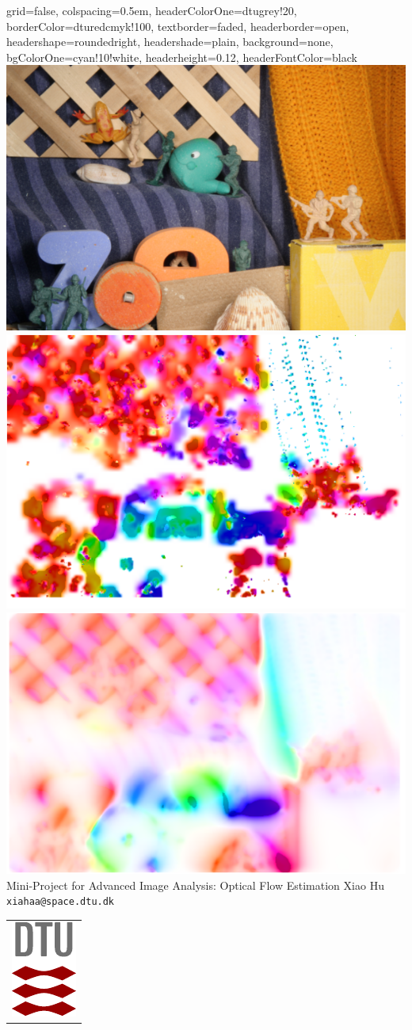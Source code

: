 \documentclass[landscape,a0paper,fontscale=0.292]{baposter}
\begin{document}
\begin{poster}{
 grid=false,
 colspacing=0.5em,
 headerColorOne=dtugrey!20,
 borderColor=dturedcmyk!100,%
 textborder=faded,
 headerborder=open,
 headershape=roundedright,
 headershade=plain,
 background=none,
 bgColorOne=cyan!10!white,
 headerheight=0.12\textheight,
 headerFontColor=black}
 {
      \includegraphics[width=0.1\linewidth]{figures/army/frame10.png}
      \includegraphics[width=0.1\linewidth]{figures/Army_LK_rgb.png}
      \includegraphics[width=0.1\linewidth]{figures/Army_HS_rgb.png}
 }
 {\sc\Huge Mini-Project for Advanced Image Analysis: Optical Flow Estimation}
 {Xiao Hu\\[0.5em]
 {\texttt{xiahaa@space.dtu.dk}}}
 {
  \begin{tabular}{r}
    \includegraphics[height=0.08\textheight]{tex_dtu_logo}
  \end{tabular}
 }



\end{poster}
\end{document}
